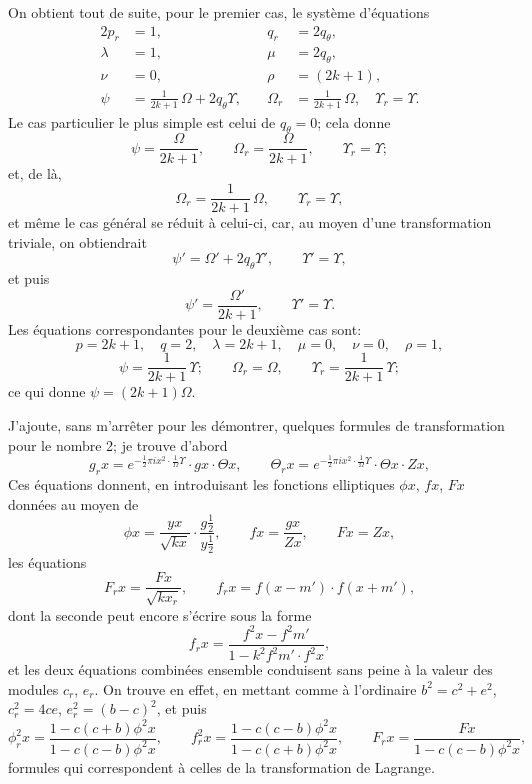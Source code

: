 \documentclass[11pt,a4paper]{book}
\begin{document}
On obtient tout de suite, pour le premier cas, le syst\`eme d'\'equations
\begin{alignat*}{2}
p_r &= 1,\quad & q_r &= 2q_\theta, \\
\lambda &= 1,\quad & \mu &= 2q_\theta, \\
\nu &= 0,\quad & \rho &= (2k+1), \\
\psi &= \tfrac{1}{2k+1}\,\Omega + 2q_\theta\Upsilon,\quad &
\Omega_r &= \tfrac{1}{2k+1}\,\Omega, \quad
\Upsilon_r = \Upsilon.
\end{alignat*}
Le cas particulier le plus simple est celui de $q_\theta = 0$; cela donne
\[
\psi = \frac{\Omega}{2k+1}, \qquad
\Omega_r = \frac{\Omega}{2k+1}, \qquad
\Upsilon_r = \Upsilon;
\]
et, de l\`a,
\[
\Omega_r = \frac{1}{2k+1}\,\Omega, \qquad
\Upsilon_r = \Upsilon,
\]
et m\^eme le cas g\'en\'eral se r\'eduit \`a celui-ci, car, au moyen d'une
transformation triviale, on obtiendrait
\[
\psi' = \Omega' + 2q_\theta\Upsilon',\qquad \Upsilon' = \Upsilon,
\]
et puis
\[
\psi' = \frac{\Omega'}{2k+1},\qquad \Upsilon' = \Upsilon.
\]
Les \'equations correspondantes pour le deuxi\`eme cas sont:
\[
p=2k+1,\quad q=2,\quad
\lambda=2k+1,\quad \mu=0,\quad \nu=0,\quad \rho=1,
\]
\[
\psi = \frac{1}{2k+1}\,\Upsilon; \qquad
\Omega_r = \Omega, \qquad
\Upsilon_r = \frac{1}{2k+1}\,\Upsilon;
\]
ce qui donne $\psi = (2k+1)\Omega$.

\medskip

J'ajoute, sans m'arr\^eter pour les d\'emontrer, quelques formules de
transformation pour le nombre 2; je trouve d'abord
\[
g_r x = e^{-\frac{1}{2}\pi i x^2 \cdot \tfrac{1}{\Omega}\Upsilon}\cdot gx\cdot\Theta x,
\qquad
\Theta_r x = e^{-\frac{1}{2}\pi i x^2 \cdot \tfrac{1}{\Omega}\Upsilon}\cdot\Theta x\cdot Zx,
\]
Ces \'equations donnent, en introduisant les fonctions elliptiques
$\phi x$, $fx$, $Fx$ donn\'ees au moyen de
\[
\phi x = \frac{yx}{\sqrt{kx}}\cdot\frac{g\tfrac{1}{2}}{y\tfrac{1}{2}},\qquad
fx = \frac{gx}{Zx},\qquad
Fx = Zx,
\]
les \'equations
\[
F_r x = \frac{F x}{\sqrt{kx_r}},\qquad
f_r x = f(x-m') \cdot f(x+m'),
\]
dont la seconde peut encore s'\'ecrire sous la forme
\[
f_r x = \frac{f^2 x - f^2 m'}{1 - k^2 f^2 m' \cdot f^2 x},
\]
et les deux \'equations combin\'ees ensemble conduisent sans peine \`a la
valeur des modules $c_r$, $e_r$.
On trouve en effet, en mettant comme \`a l'ordinaire $b^2 = c^2 + e^2$,
$c_r^2 = 4ce$, $e_r^2 = (b-c)^2$, et puis
\[
\phi_r^2 x = \frac{1-c(c+b)\phi^2 x}{1-c(c-b)\phi^2 x},\qquad
f_r^2 x = \frac{1-c(c-b)\phi^2 x}{1-c(c+b)\phi^2 x},\qquad
F_r x = \frac{Fx}{1-c(c-b)\phi^2 x},
\]
formules qui correspondent \`a celles de la transformation de Lagrange.
\end{document}
